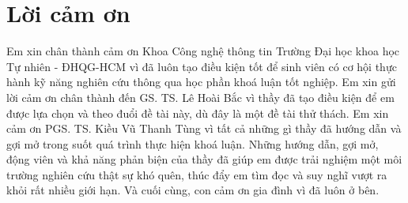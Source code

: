 \chapter*{Lời cảm ơn}
\label{thanks}

Em xin chân thành cảm ơn Khoa Công nghệ thông tin Trường Đại học khoa học Tự nhiên - ĐHQG-HCM vì đã luôn tạo điều kiện tốt để sinh viên có cơ hội thực hành kỹ năng nghiên cứu thông qua học phần khoá luận tốt nghiệp. Em xin gửi lời cảm ơn chân thành đến GS. TS. Lê Hoài Bắc vì thầy đã tạo điều kiện để em được lựa chọn và theo đuổi đề tài này, dù đây là một đề tài thử thách. Em xin cảm ơn PGS. TS. Kiều Vũ Thanh Tùng vì tất cả những gì thầy đã hướng dẫn và gợi mở trong suốt quá trình thực hiện khoá luận. Những hướng dẫn, gợi mở, động viên và khả năng phản biện của thầy đã giúp em được trải nghiệm một môi trường nghiên cứu thật sự khó quên, thúc đẩy em tìm đọc và suy nghĩ vượt ra khỏi rất nhiều giới hạn. Và cuối cùng, con cảm ơn gia đình vì đã luôn ở bên.